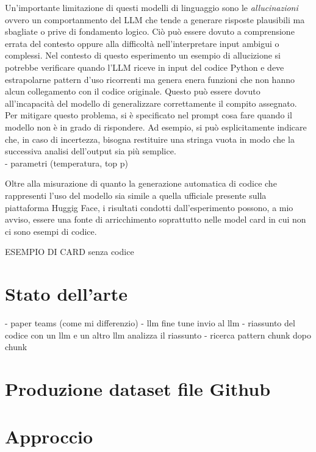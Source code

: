 \documentclass{article}
\begin{document}
\begin{itemize}
Un'importante limitazione di questi modelli di linguaggio sono le \textit{allucinazioni} ovvero un comportanmento del LLM che tende a generare risposte plausibili ma sbagliate o prive di fondamento logico. Ciò può essere dovuto a comprensione errata del contesto oppure alla difficoltà nell’interpretare input ambigui o complessi. Nel contesto di questo esperimento un esempio di allucizione si potrebbe verificare quando l'LLM riceve in input del codice Python e deve estrapolarne pattern d'uso ricorrenti ma genera enera funzioni che non hanno alcun collegamento con il codice originale. Questo può essere dovuto all’incapacità del modello di generalizzare correttamente il compito assegnato. Per mitigare questo problema, si è specificato nel prompt cosa fare quando il modello non è in grado di rispondere. Ad esempio, si può esplicitamente indicare che, in caso di incertezza, bisogna restituire una stringa vuota in modo che la successiva analisi dell'output sia più semplice.\\

- parametri (temperatura, top p)



\end{itemize}

Oltre alla misurazione di quanto la generazione automatica di codice che rappresenti l'uso del modello sia simile a quella ufficiale presente sulla piattaforma Huggig Face, i risultati condotti dall'esperimento possono, a mio avviso, essere una fonte di arricchimento soprattutto nelle model card in cui non ci sono esempi di codice.

ESEMPIO DI CARD senza codice

\section{Stato dell'arte}
- paper teams (come mi differenzio)
- llm fine tune 
invio al llm
- riassunto del codice con un llm e un altro llm analizza il riassunto
- ricerca pattern chunk dopo chunk

\section{Produzione dataset file Github}



\section{Approccio}
\end{document}
